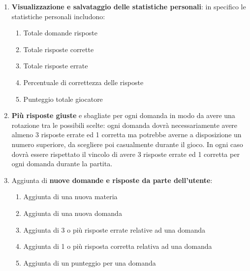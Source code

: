 \begin{enumerate}
            \item \textbf{Visualizzazione e salvataggio delle statistiche personali}: in specifico le statistiche personali includono:
                \begin{enumerate}
                    \item Totale domande risposte
                    \item Totale risposte corrette
                    \item Totale risposte errate
                    \item Percentuale di correttezza delle risposte
                    \item Punteggio totale giocatore
                \end{enumerate}
            
            \item \textbf{Più risposte giuste} e sbagliate per ogni domanda in modo da avere una rotazione tra le possibili scelte: ogni domanda dovrà necessariamente avere almeno 3 risposte errate ed 1 corretta ma potrebbe averne a disposizione un numero superiore, da scegliere poi casualmente durante il gioco. In ogni caso dovrà essere rispettato il vincolo di avere 3 risposte errate ed 1 corretta per ogni domanda durante la partita.
            
            \item Aggiunta di \textbf{nuove domande e risposte da parte dell’utente}:
                \begin{enumerate}
                        \item Aggiunta di una nuova materia
                        \item Aggiunta di una nuova domanda
                        \item Aggiunta di 3 o più risposte errate relative ad una domanda
                        \item Aggiunta di 1 o più risposta corretta relativa ad una domanda
                        \item Aggiunta di un punteggio per una domanda
                    \end{enumerate}
        \end{enumerate}  

    
